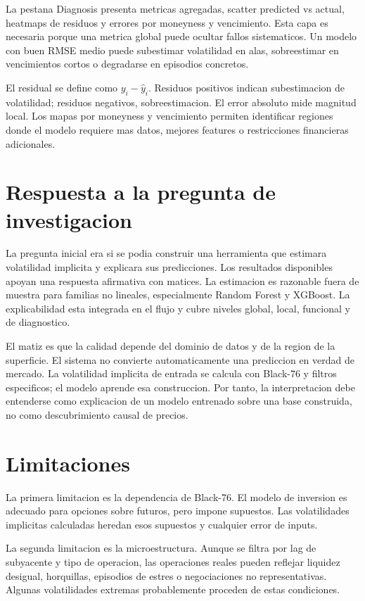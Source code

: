 La pestana Diagnosis presenta metricas agregadas, scatter predicted vs actual, heatmaps de residuos y errores por moneyness y vencimiento. Esta capa es necesaria porque una metrica global puede ocultar fallos sistematicos. Un modelo con buen RMSE medio puede subestimar volatilidad en alas, sobreestimar en vencimientos cortos o degradarse en episodios concretos.

El residual se define como $y_i-\hat{y}_i$. Residuos positivos indican subestimacion de volatilidad; residuos negativos, sobreestimacion. El error absoluto mide magnitud local. Los mapas por moneyness y vencimiento permiten identificar regiones donde el modelo requiere mas datos, mejores features o restricciones financieras adicionales.

\section{Respuesta a la pregunta de investigacion}

La pregunta inicial era si se podia construir una herramienta que estimara volatilidad implicita y explicara sus predicciones. Los resultados disponibles apoyan una respuesta afirmativa con matices. La estimacion es razonable fuera de muestra para familias no lineales, especialmente Random Forest y XGBoost. La explicabilidad esta integrada en el flujo y cubre niveles global, local, funcional y de diagnostico.

El matiz es que la calidad depende del dominio de datos y de la region de la superficie. El sistema no convierte automaticamente una prediccion en verdad de mercado. La volatilidad implicita de entrada se calcula con Black-76 y filtros especificos; el modelo aprende esa construccion. Por tanto, la interpretacion debe entenderse como explicacion de un modelo entrenado sobre una base construida, no como descubrimiento causal de precios.

\section{Limitaciones}

La primera limitacion es la dependencia de Black-76. El modelo de inversion es adecuado para opciones sobre futuros, pero impone supuestos. Las volatilidades implicitas calculadas heredan esos supuestos y cualquier error de inputs.

La segunda limitacion es la microestructura. Aunque se filtra por lag de subyacente y tipo de operacion, las operaciones reales pueden reflejar liquidez desigual, horquillas, episodios de estres o negociaciones no representativas. Algunas volatilidades extremas probablemente proceden de estas condiciones.

